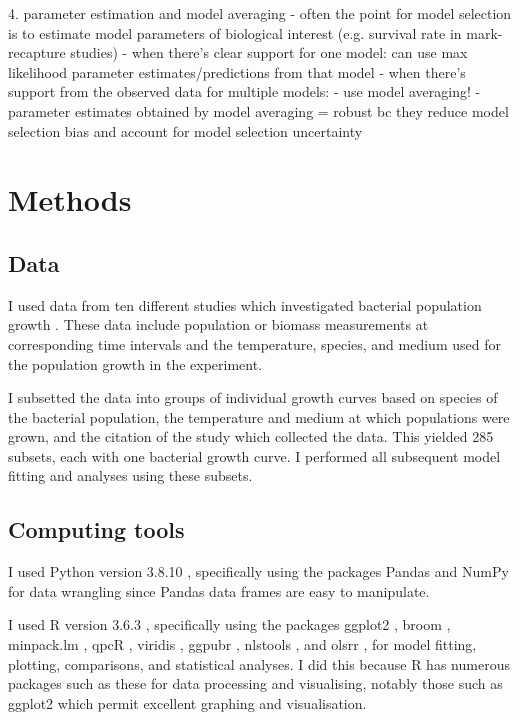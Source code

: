 \documentclass[11pt]{article}
\begin{document}
	4. parameter estimation and model averaging
	- often the point for model selection is to estimate model parameters of biological interest (e.g. survival rate in mark-recapture studies)
	- when there's clear support for one model: can use max likelihood parameter estimates/predictions from that model
	- when there's support from the observed data for multiple models:
	- use model averaging!
	- parameter estimates obtained by model averaging = robust bc they reduce model selection bias and account for model selection uncertainty
	
	
	
	\section{Methods}
	
	\subsection{Data}
	
	I used data from ten different studies which investigated bacterial population growth \cite{bae2014growth, bernhardt2018metabolic, galarz2016predicting, gill1991growth, phillips1987relation, roth1962continuity, silva2018modelling, sivonen1990effects, stannard1985temperature, zwietering1994modeling}. These data include population or biomass measurements at corresponding time intervals and the temperature, species, and medium used for the population growth in the experiment.
	
	I subsetted the data into groups of individual growth curves based on species of the bacterial population, the temperature and medium at which populations were grown, and the citation of the study which collected the data. This yielded 285 subsets, each with one bacterial growth curve. I performed all subsequent model fitting and analyses using these subsets.
	
	\subsection{Computing tools}
	
	I used Python version 3.8.10 \cite{10.5555/1593511}, specifically using the packages Pandas \cite{mckinney2010data} and NumPy \cite{harris2020array} for data wrangling since Pandas data frames are easy to manipulate.
	
	I used R version 3.6.3 \cite{R_citation}, specifically using the packages ggplot2 \cite{ggplot2_citation}, broom \cite{robinson2014broom}, minpack.lm \cite{elzhov2010r}, qpcR \cite{Ahmed2018-ni}, viridis \cite{viridis_citation}, ggpubr \cite{kassambara2020package}, nlstools \cite{nlstools_citation}, and olsrr \cite{hebbali2017package}, for model fitting, plotting, comparisons, and statistical analyses. I did this because R has numerous packages such as these for data processing and visualising, notably those such as ggplot2 which permit excellent graphing and visualisation. 
	
\end{document}
